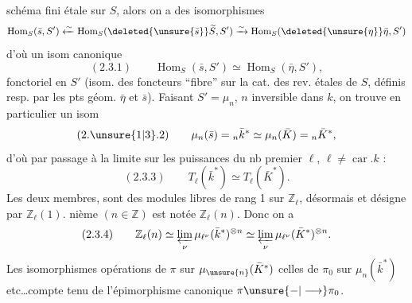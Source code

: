 
schéma fini étale sur $S$, alors on a des isomorphismes
\[
\operatorname{Hom}_S(\bar s,S')\xleftarrow{\sim}\operatorname{Hom}_S(\deleted{\unsure{\bar s}}\widetilde S,S')\xrightarrow{\sim}\operatorname{Hom}_S(\deleted{\unsure{\eta}}\bar\eta,S')
\]
d'où un isom canonique
\[
(2.3.1)\qquad\operatorname{Hom}_S(\bar s,S')\simeq\operatorname{Hom}_S(\bar\eta,S'),
\]
fonctoriel en $S'$ (isom. des  foncteurs ``fibre'' sur la cat. des rev. étales de $S$, définis resp. par les pts géom. $\bar\eta$ et $\bar s$). Faisant $S'=\mu_n$, $n$  inversible dans $k$, on trouve en particulier un isom
\[
(2.\unsure{1|3}.2)\qquad \mu_n(\bar s)={}_n\bar k^*\simeq\mu_n(\bar K)={}_n\bar K^*,
\]
d'où par passage à la limite sur les puissances du nb premier $\ell$, $\ell\ne\operatorname{car}.k$ :
\[
(2.3.3)\qquad T_\ell(\bar k^*)\simeq T_\ell(\bar K^*).
\]
 Les deux membres,  sont des modules libres de rang 1 sur $\mathbb Z_\ell$,   désormais et désigne par $\mathbb Z_\ell(1)$.   nième $(n\in\mathbb Z)$ est notée $\mathbb Z_\ell(n)$. Donc on a
\[
(2.3.4)\qquad \mathbb Z_\ell(n)\simeq\varprojlim_\nu\mu_{\ell^\nu}(\bar k^*)^{\otimes n}\simeq\varprojlim_\nu\mu_{\ell^\nu}(\bar K^*)^{\otimes n}.
\]
Les isomorphismes  opérations de $\pi$ sur $\mu_{\unsure{n}}(\bar K^*)$   celles de $\pi_0$ sur $\mu_n(\bar k^*)$ etc\ldots compte tenu de l'épimorphisme canonique $\pi\unsure{-|\longrightarrow}\pi_0$.
